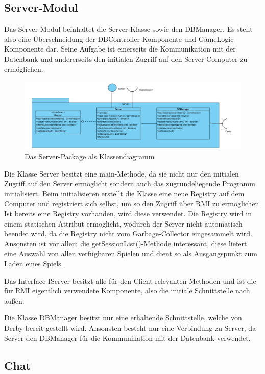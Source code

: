 \documentclass[fontsize=12pt,paper=a4,twoside]{scrartcl}
\begin{document}
\subsection{Server-Modul}

Das Server-Modul beinhaltet die Server-Klasse sowie den DBManager. Es stellt also eine Überschneidung der DBController-Komponente und GameLogic-Komponente dar. Seine Aufgabe ist einerseits die Kommunikation mit der Datenbank und andererseits den initialen Zugriff auf den Server-Computer zu ermöglichen.

\begin{figure}[h]
\centering
\includegraphics[width=1.0\linewidth]{ServerClass}
\caption{Das Server-Package als Klassendiagramm}
\label{fig:ServerClass}
\end{figure}

Die Klasse Server besitzt eine main-Methode, da sie nicht nur den initialen Zugriff auf den Server ermöglicht sondern auch das zugrundeliegende Programm initialisiert. Beim initialisieren erstellt die Klasse eine neue Registry auf dem Computer und registriert sich selbst, um so den Zugriff über RMI zu ermöglichen. Ist bereits eine Registry vorhanden, wird diese verwendet. Die Registry wird in einem statischen Attribut ermöglicht, wodurch der Server nicht automatisch beendet wird, da die Registry nicht vom Garbage-Collector eingesammelt wird. Ansonsten ist vor allem die getSessionList()-Methode interessant, diese liefert eine Auswahl von allen verfügbaren Spielen und dient so als Ausgangspunkt zum Laden eines Spiels.

Das Interface IServer besitzt alle für den Client relevanten Methoden und ist die für RMI eigentlich verwendete Komponente, also die initiale Schnittstelle nach außen.

Die Klasse DBManager besitzt nur eine erhaltende Schnittstelle, welche von Derby bereit gestellt wird. Ansonsten besteht nur eine Verbindung zu Server, da Server den DBManager für die Kommunikation mit der Datenbank verwendet.

\subsection{Chat}
\end{document}
